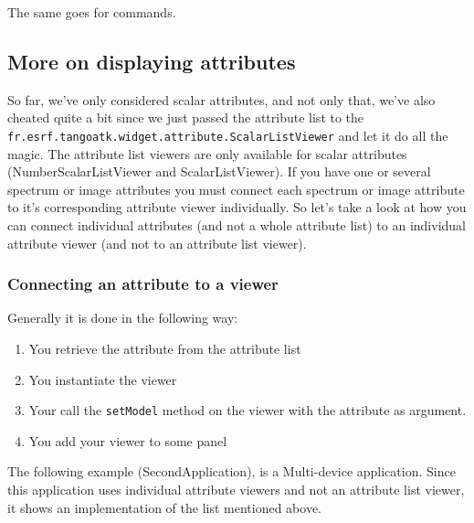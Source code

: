 The same goes for commands.

\subsection{More on displaying attributes}

So far, we've only considered scalar attributes, and
not only that, we've also cheated quite a bit since we just passed
the attribute list to the \texttt{fr.esrf.tangoatk.widget.attribute.ScalarListViewer}
and let it do all the magic. The attribute list viewers are only available
for scalar attributes (NumberScalarListViewer
and ScalarListViewer). If you have one or
several spectrum or image attributes
you must connect each spectrum or image attribute to it's corresponding
attribute viewer individually. So let's take a look at how you can
connect individual attributes (and not a whole attribute list) to
an individual attribute viewer (and not to an attribute list viewer).

\subsubsection{Connecting an attribute to a viewer}

Generally it is done in the following way:
\begin{enumerate}
\item You retrieve the attribute from the attribute list 
\item You instantiate the viewer 
\item Your call the \texttt{setModel} method on the viewer
with the attribute as argument. 
\item You add your viewer to some panel
\end{enumerate}
The following example (SecondApplication),
is a Multi-device application. Since this application uses individual
attribute viewers and not an attribute list viewer, it shows an implementation
of the list mentioned above.

